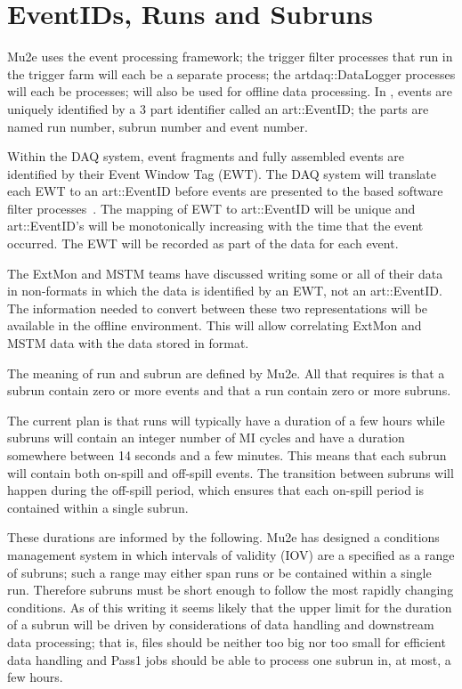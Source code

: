 \section{EventIDs, Runs and Subruns}
\label{sec:TagsIDsRunsSubRuns}


Mu2e uses the \art event processing framework;
the trigger filter processes that run in the trigger farm will each be a separate \art process;
the {\code artdaq::DataLogger} processes will each be \art processes;
\art will also be used for offline data processing.
In \art, events are uniquely identified by a 3 part identifier called an
{\code art::EventID}; the parts are named run number, subrun number
and event number.

Within the DAQ system, event fragments and fully assembled events
are identified by their Event Window Tag (EWT).
The DAQ system will translate each EWT to an {\code art::EventID}
before events are presented to the \art based software filter processes~\cite{EventLabels}.
The mapping of EWT to  {\code art::EventID} will be unique and
{\code art::EventID}'s will be monotonically increasing with the time
that the event occurred.
The EWT will be recorded as part of the \art data for each event.

The ExtMon and MSTM teams have discussed writing some or all of their data in non-\art formats
in which the data is identified by an EWT, not an {\code art::EventID}.
The information needed to convert between these two representations
will be available in the offline environment.
This will allow correlating ExtMon and MSTM data with the data stored in \art format.

The meaning of run and subrun are defined by Mu2e.
All that \art requires is that a subrun contain zero or more
events and that a run contain zero or more subruns.

The current plan is that runs will typically have a duration of a few hours
while subruns will contain an integer number of MI cycles and
have a duration somewhere between 14 seconds and a few minutes.
This means that each subrun will contain both on-spill and
off-spill events.
The transition between subruns will happen during the off-spill period,
which ensures that each on-spill period is contained within a single subrun.

These durations are informed by the following.
Mu2e has designed a conditions management system
in which intervals of validity (IOV) are a specified as a range of subruns;
such a range may either span runs or be contained within a single run.
Therefore subruns must be short enough to follow the most
rapidly changing conditions.  As of this writing it seems
likely that the upper limit for the duration of a subrun will
be driven by considerations of data handling and downstream data processing;
that is, files should be neither too big nor too small for efficient data handling
and Pass1 jobs should be able to process one subrun in, at most, a few hours.

